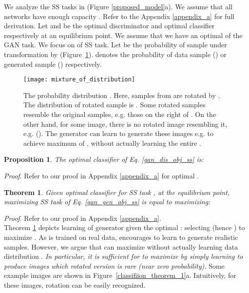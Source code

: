 \documentclass{article}
\newtheorem{proposition}{Proposition}
\newtheorem{theorem}{Theorem}
\begin{document}
We analyze the SS tasks in \cite{chen-arxiv-2018} (Figure \ref{proposed_model}a).
We assume that all networks  have enough capacity \cite{goodfellow-nisp-2014}. Refer to the Appendix \ref{appendix_a} for full derivation. Let  and  be the optimal discriminator and optimal classifier respectively at an equilibrium point. We assume that we have an optimal  of the GAN task. We focus on  of SS task. Let  be the probability of sample  
under transformation by 
(Figure~\ref{mixture_of_distribution}).  denotes the probability  of data sample () or generated sample () respectively.

\begin{figure}
  \centering
  \texttt{[image: mixture\_of\_distribution]}
  \caption{The probability distribution . Here, samples from  are rotated by . The distribution of rotated sample is .
Some rotated samples resemble the original samples, e.g. those on the right of . On the other hand, for some image, there is no rotated image resembling it, e.g.  (). The generator can learn to generate these images e.g.  to achieve maximum of , without actually learning the entire .
  }
\label{mixture_of_distribution}
   \vspace{-0.3cm}
\end{figure}


\begin{proposition}
The optimal classifier  of Eq. \ref{gan_dis_obj_ss} is:

\label{prop_1}
\end{proposition}
\noindent \textit{Proof}. Refer to our proof in Appendix \ref{appendix_a} for optimal .


\begin{theorem}
Given optimal classifier  for SS task ,
at the equilibrium point, maximizing SS task  of Eq. \ref{gan_gen_obj_ss} is equal to maximizing:

\label{theorem_1}
\end{theorem}
\noindent \textit{Proof}. Refer to our proof in Appendix \ref{appendix_a}.\\

Theorem \ref{theorem_1} depicts learning of generator 
given the optimal : selecting  (hence ) to 
maximize .
As  is trained on real data,   encourages   to learn to generate realistic samples. However, we argue that  can maximize  without actually learning data distribution . 
{\em In particular, it is sufficient for  to  maximize  by  simply learning to produce images which rotated version is rare (near zero probability).} Some example images are shown in Figure~\ref{classifiion_theorem_1}a. Intuitively, for these images, rotation can be easily recognized.
\end{document}
